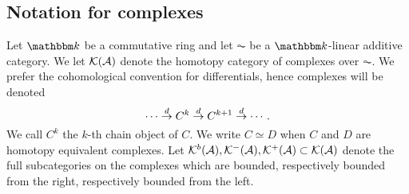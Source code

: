 %
%
%
%
%
%
%
%



\subsection{Notation for complexes} 

Let $\kbbm$ be a commutative ring and let $\AC$ be a $\kbbm$-linear additive category.  We let ${\mathcal{K}}({\mathcal{A}})$ denote the homotopy category of complexes over $\AC$.  We prefer the cohomological convention for differentials, hence complexes will be denoted
\[
\cdots \buildrel d\over \rightarrow C^k \buildrel d\over \rightarrow C^{k+1}\buildrel d\over \rightarrow \cdots.
\]
We call $C^k$ the $k$-th chain object of $C$. We write $C \simeq D$ when $C$ and $D$ are homotopy equivalent complexes. Let ${\mathcal{K}}^b({\mathcal{A}}),{\mathcal{K}}^-({\mathcal{A}}),{\mathcal{K}}^+({\mathcal{A}})\subset {\mathcal{K}}({\mathcal{A}})$ denote the full subcategories on the complexes which are bounded, respectively bounded from the right, respectively bounded from the left.

